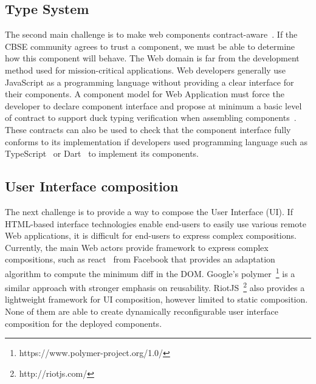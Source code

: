
\subsection{Type System}
The second main challenge is to make web components contract-aware~\cite{beugnard1999making}. If the CBSE community agrees to trust a component, we must be able to determine how this component will behave. The Web domain is far from the development method used for  mission-critical applications. Web developers generally use JavaScript as a programming language without providing a clear interface for their components. A component model for Web Application must force the developer to declare component interface and propose at minimum a basic level of contract to support duck typing verification when assembling components~\cite{beugnard1999making}. These contracts can also be used to check that the component interface fully conforms to its implementation if developers used  programming language such as TypeScript~\cite{rastogi2015safe} or Dart~\cite{dhiman2012google} to implement its components.

\subsection{User Interface composition}
The next challenge is to provide a way to compose the User Interface (UI). If HTML-based interface technologies enable end-users to easily use various remote Web applications, it is difficult for end-users to express complex compositions. Currently, the main Web actors provide framework to express complex compositions, such as react~\cite{fedosejev2015react} from Facebook that provides an adaptation algorithm to compute the minimum diff in the DOM. Google's polymer~\footnote{https://www.polymer-project.org/1.0/} is a similar approach with stronger emphasis on reusability. RiotJS~\footnote{http://riotjs.com/} also provides a lightweight framework for UI composition, however limited to static composition.
None of them are able to create dynamically reconfigurable user interface composition for the deployed components.

